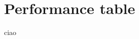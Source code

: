 


\section{Performance table}
ciao

\cite{patil2017deep}

\cite{liu2017monza}

\cite{liu2018deep}

\cite{guo2018review}

\cite{he2017mask}

\cite{chahal2018survey}

\cite{xie2018bag}